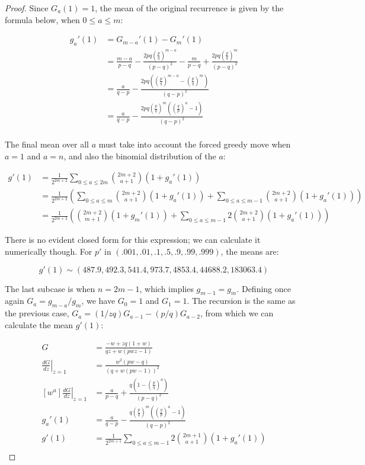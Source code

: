 \documentclass[10pt]{book}
\begin{document}
\begin{proof}
Since $G_a(1)=1$, the mean of the original recurrence is given by the formula below, when $0\le a\le m$:

\begin{align*}
  g_a'(1) &= G_{m-a}'(1)-G_{m}'(1) \\
    &= \frac{m-a}{p-q}-\frac{2pq\left(\frac{p}{q}\right)^{m-a}}{(p-q)^2}
    - \frac{m}{p-q}+\frac{2pq\left(\frac{p}{q}\right)^{m}}{(p-q)^2}\\
    &= \frac{a}{q-p}-\frac{2pq\left(
  \left(\frac{p}{q}\right)^{m-a}-\left(\frac{p}{q}\right)^m\right)}{(q-p)^2}\\
  &= \frac{a}{q-p}-\frac{2pq\left(\frac{p}{q}\right)^{m}\left(
     \left(\frac{q}{p}\right)^{a}-1\right)}{(q-p)^2}\\
\end{align*}

The final mean over all $a$ must take into account the forced greedy move when $a=1$ and $a=n$, and also the binomial distribution of the $a$:

\begin{align*}
  g'(1) 
    &= \frac{1}{2^{2m+2}}\sum_{0\le a\le 2m}{2m+2 \choose a+1}(1+g_a'(1))\\
    &= \frac{1}{2^{2m+2}}\left(
      \sum_{0\le a\le m}{2m+2 \choose a+1}(1+g_a'(1)) +
      \sum_{0\le a\le m-1}{2m+2 \choose a+1}(1+g_a'(1))
    \right)\\
      &= \frac{1}{2^{2m+2}}\left( {2m+2\choose m+1}(1+g_m'(1))+
      \sum_{0\le a\le m-1}2{2m+2 \choose a+1}(1+g_a'(1))
    \right)
\end{align*}

There is no evident closed form for this expression; we can calculate it numerically though. For $p'$ in $(.001, .01, .1, .5, .9, .99, .999)$, the means are:

$$g'(1) \sim (487.9, 492.3, 541.4, 973.7, 4853.4, 44688.2, 183063.4)$$

The last subcase is when $n=2m-1$, which implies $g_{m-1}=g_m$. Defining once again $G_a=g_{m-a}/g_m$, we have $G_0=1$ and $G_1=1$. The recursion is the same as the previous case, $G_a=(1/zq) G_{a-1}-(p/q)G_{a-2}$, from which we can calculate the mean $g'(1)$:

\begin{align*}
  G &= \frac{-w+zq(1+w)}{qz+w(pwz-1)} \\
  \left.\frac{dG}{dz}\right\rvert_{z=1}   
  &= \frac{w^2(pw-q)}{(q+w(pw-1))^2} \\
  [w^a]  \left.\frac{dG}{dz}\right\rvert_{z=1}   
    &= \frac{a}{p-q}+\frac{q\left(1-\left(\frac{p}{q}\right)^a\right)}{(p-q)^2}\\
  g_a'(1) &= \frac{a}{q-p}-\frac{q\left(\frac{p}{q}\right)^m
             \left(\left(\frac{q}{p}\right)^a-1\right)}{(q-p)^2}\\
  g'(1) &= \frac{1}{2^{2m+1}}
      \sum_{0\le a\le m-1}2{2m+1 \choose a+1}(1+g_a'(1))\\
\end{align*}

\end{proof}
\end{document}
